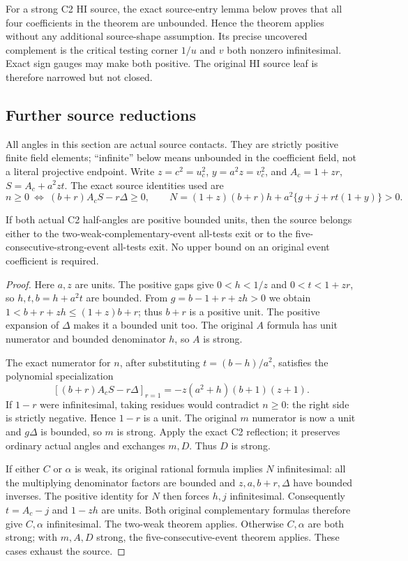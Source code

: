 For a strong C2 HI source, the exact source-entry lemma below proves
that all four coefficients in the theorem are unbounded. Hence the
theorem applies without any additional source-shape assumption.
Its precise uncovered complement is the critical testing corner
$1/u$ and $v$ both nonzero infinitesimal. Exact sign gauges may
make both positive.
The original HI source leaf is therefore narrowed but not closed.

\subsection{Further source reductions}
\label{component:pe56fb394b522}

\label{pe56fb394b522:sec:c2-angle-reductions}

All angles in this section are actual source contacts. They are strictly
positive finite field elements; ``infinite'' below means unbounded in
the coefficient field, not a literal projective endpoint. Write
$z=c^2=u_c^2$, $y=a^2z=v_c^2$, and
$A_c=1+zr$, $S=A_c+a^2zt$. The exact source identities used are
\[
 n\ge0\ \Longleftrightarrow\ (b+r)A_cS-r\Delta\ge0,
 \qquad
 N=(1+z)(b+r)h+a^2\{g+j+rt(1+y)\}>0.
\]

\begin{theorem}
If both actual C2 half-angles are positive bounded units, then the
source belongs either to the two-weak-complementary-event all-tests
exit or to the five-consecutive-strong-event all-tests exit. No upper
bound on an original event coefficient is required.
\end{theorem}
\begin{proof}
Here $a,z$ are units. The positive gaps give $0<h<1/z$ and
$0<t<1+zr$, so $h,t,b=h+a^2t$ are bounded. From
$g=b-1+r+zh>0$ we obtain $1<b+r+zh\le(1+z)b+r$;
thus $b+r$ is a positive unit. The positive expansion of $\Delta$
makes it a bounded unit too. The original $A$ formula has unit
numerator and bounded denominator $h$, so $A$ is strong.

The exact numerator for $n$, after substituting $t=(b-h)/a^2$,
satisfies the polynomial specialization
\[
 \left[(b+r)A_cS-r\Delta\right]_{r=1}
     =-z(a^2+h)(b+1)(z+1).
\]
If $1-r$ were infinitesimal, taking residues would contradict
$n\ge0$: the right side is strictly negative. Hence $1-r$ is a
unit. The original $m$ numerator is now a unit and $g\Delta$ is
bounded, so $m$ is strong. Apply the exact C2 reflection; it preserves
ordinary actual angles and exchanges $m,D$. Thus $D$ is strong.

If either $C$ or $\alpha$ is weak, its original rational formula
implies $N$ infinitesimal: all the multiplying denominator factors
are bounded and $z,a,b+r,\Delta$ have bounded inverses. The positive
identity for $N$ then forces $h,j$ infinitesimal. Consequently
$t=A_c-j$ and $1-zh$ are units. Both original complementary formulas
therefore give $C,\alpha$ infinitesimal. The two-weak theorem applies.
Otherwise $C,\alpha$ are both strong; with $m,A,D$ strong, the
five-consecutive-event theorem applies. These cases exhaust the source.
\end{proof}

